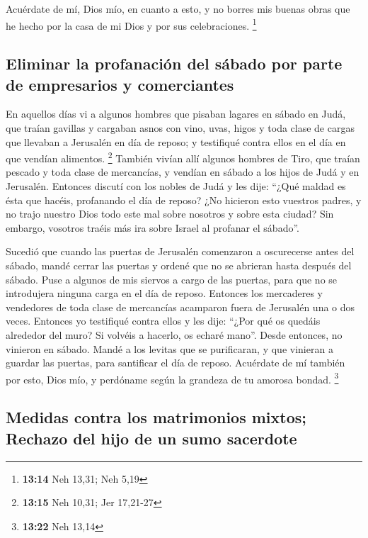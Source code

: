  Acuérdate de mí, Dios mío, en cuanto a esto, y no borres
mis buenas obras que he hecho por la casa de mi Dios y por sus
celebraciones. \footnote{\textbf{13:14} Neh 13,31; Neh 5,19}

\hypertarget{eliminar-la-profanaciuxf3n-del-suxe1bado-por-parte-de-empresarios-y-comerciantes}{%
\subsection{Eliminar la profanación del sábado por parte de empresarios
y
comerciantes}\label{eliminar-la-profanaciuxf3n-del-suxe1bado-por-parte-de-empresarios-y-comerciantes}}

 En aquellos días vi a algunos hombres que pisaban
lagares en sábado en Judá, que traían gavillas y cargaban asnos con
vino, uvas, higos y toda clase de cargas que llevaban a Jerusalén en día
de reposo; y testifiqué contra ellos en el día en que vendían alimentos.
\footnote{\textbf{13:15} Neh 10,31; Jer 17,21-27} 
También vivían allí algunos hombres de Tiro, que traían pescado y toda
clase de mercancías, y vendían en sábado a los hijos de Judá y en
Jerusalén.  Entonces discutí con los nobles de Judá y les
dije: ``¿Qué maldad es ésta que hacéis, profanando el día de reposo?
 ¿No hicieron esto vuestros padres, y no trajo nuestro
Dios todo este mal sobre nosotros y sobre esta ciudad? Sin embargo,
vosotros traéis más ira sobre Israel al profanar el sábado''.

 Sucedió que cuando las puertas de Jerusalén comenzaron a
oscurecerse antes del sábado, mandé cerrar las puertas y ordené que no
se abrieran hasta después del sábado. Puse a algunos de mis siervos a
cargo de las puertas, para que no se introdujera ninguna carga en el día
de reposo.  Entonces los mercaderes y vendedores de toda
clase de mercancías acamparon fuera de Jerusalén una o dos veces.
 Entonces yo testifiqué contra ellos y les dije: ``¿Por
qué os quedáis alrededor del muro? Si volvéis a hacerlo, os echaré
mano''. Desde entonces, no vinieron en sábado.  Mandé a
los levitas que se purificaran, y que vinieran a guardar las puertas,
para santificar el día de reposo. Acuérdate de mí también por esto, Dios
mío, y perdóname según la grandeza de tu amorosa bondad. \footnote{\textbf{13:22}
  Neh 13,14}

\hypertarget{medidas-contra-los-matrimonios-mixtos-rechazo-del-hijo-de-un-sumo-sacerdote}{%
\subsection{Medidas contra los matrimonios mixtos; Rechazo del hijo de
un sumo
sacerdote}\label{medidas-contra-los-matrimonios-mixtos-rechazo-del-hijo-de-un-sumo-sacerdote}}

